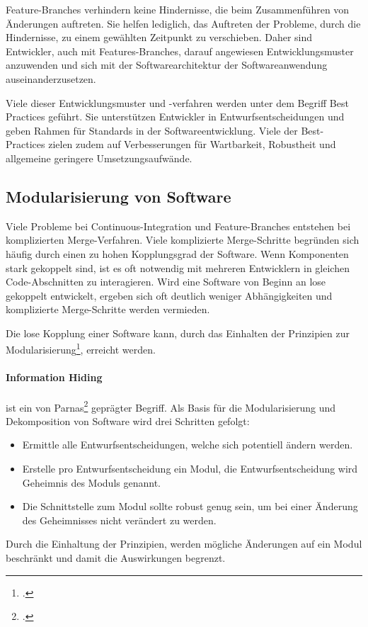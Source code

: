 Feature-Branches verhindern keine Hindernisse, die beim Zusammenführen von Änderungen auftreten. Sie helfen lediglich, das Auftreten der Probleme, durch die Hindernisse, zu einem gewählten Zeitpunkt zu verschieben. Daher sind Entwickler, auch mit Features-Branches, darauf angewiesen Entwicklungsmuster anzuwenden und sich mit der Softwarearchitektur der Softwareanwendung auseinanderzusetzen.

Viele dieser Entwicklungsmuster und -verfahren werden unter dem Begriff \glqq Best Practices\grqq{} geführt. Sie unterstützen Entwickler in Entwurfsentscheidungen und geben Rahmen für Standards in der Softwareentwicklung. Viele der Best-Practices zielen zudem auf Verbesserungen für Wartbarkeit, Robustheit und allgemeine geringere Umsetzungsaufwände.

\subsection{Modularisierung von Software}

Viele Probleme bei Continuous-Integration und Feature-Branches entstehen bei komplizierten Merge-Verfahren. Viele komplizierte Merge-Schritte begründen sich häufig durch einen zu hohen Kopplungsgrad der Software. Wenn Komponenten stark gekoppelt sind, ist es oft notwendig mit mehreren Entwicklern in gleichen Code-Abschnitten zu interagieren. Wird eine Software von Beginn an lose gekoppelt entwickelt, ergeben sich oft deutlich weniger Abhängigkeiten und komplizierte Merge-Schritte werden vermieden.

Die lose Kopplung einer Software kann, durch das Einhalten der Prinzipien zur Modularisierung\footcite{2012-barth-modularisation}, erreicht werden. 

\paragraph{Information Hiding} ist ein von Parnas\footcite{1972-parnas} geprägter Begriff. Als Basis für die Modularisierung und Dekomposition von Software wird drei Schritten gefolgt:
\begin{itemize}
\item Ermittle alle Entwurfsentscheidungen, welche sich potentiell ändern werden.
\item Erstelle pro Entwurfsentscheidung ein Modul, die Entwurfsentscheidung wird \glqq Geheimnis des Moduls\grqq{} genannt.
\item Die Schnittstelle zum Modul sollte robust genug sein, um bei einer Änderung des Geheimnisses nicht verändert zu werden.
\end{itemize}
Durch die Einhaltung der Prinzipien, werden mögliche Änderungen auf ein Modul beschränkt und damit die Auswirkungen begrenzt.
